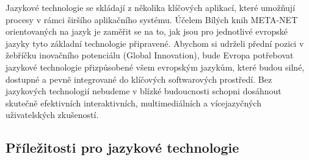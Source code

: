 \begin{multicols}{2}
Jazykové technologie se skládají z několika klíčových aplikací, které umožňují procesy v rámci širšího aplikačního systému. Účelem Bílých knih META-NET orientovaných na jazyk je zaměřit se na to, jak jsou pro jednotlivé evropské jazyky tyto základní technologie připravené.
Abychom si udrželi přední pozici v žebříčku inovačního potenciálu (Global Innovation), bude Evropa potřebovat jazykové technologie přizpůsobené všem evropským jazykům, které budou silné, dostupné a pevně integrované do klíčových softwarových prostředí. Bez jazykových technologií nebudeme v blízké budoucnosti schopni dosáhnout skutečně efektivních interaktivních, multimediálních a vícejazyčných uživatelských zkušeností.

\subsection{Příležitosti pro jazykové technologie}


\end{multicols}
